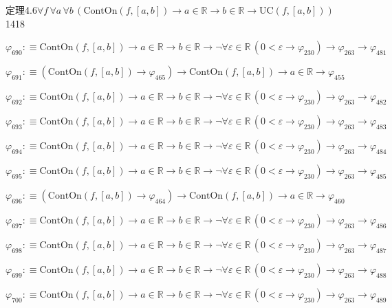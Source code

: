 \begin{fullproof}{定理4.6}{$\forall f\,\forall a\,\forall b\,(\mathrm{ContOn}(f,[a,b]) \to a \in \mathbb{R} \to b \in \mathbb{R} \to \mathrm{UC}(f,[a,b]))$}{1418}
\begin{abbrevlist}
\item $\varphi_{690} :\equiv \mathrm{ContOn}(f,[a,b]) \to a \in \mathbb{R} \to b \in \mathbb{R} \to \neg \forall \varepsilon \in \mathbb{R}\,(0 < \varepsilon \to \varphi_{230}) \to \varphi_{263} \to \varphi_{481}$
\item $\varphi_{691} :\equiv (\mathrm{ContOn}(f,[a,b]) \to \varphi_{465}) \to \mathrm{ContOn}(f,[a,b]) \to a \in \mathbb{R} \to \varphi_{455}$
\item $\varphi_{692} :\equiv \mathrm{ContOn}(f,[a,b]) \to a \in \mathbb{R} \to b \in \mathbb{R} \to \neg \forall \varepsilon \in \mathbb{R}\,(0 < \varepsilon \to \varphi_{230}) \to \varphi_{263} \to \varphi_{482}$
\item $\varphi_{693} :\equiv \mathrm{ContOn}(f,[a,b]) \to a \in \mathbb{R} \to b \in \mathbb{R} \to \neg \forall \varepsilon \in \mathbb{R}\,(0 < \varepsilon \to \varphi_{230}) \to \varphi_{263} \to \varphi_{483}$
\item $\varphi_{694} :\equiv \mathrm{ContOn}(f,[a,b]) \to a \in \mathbb{R} \to b \in \mathbb{R} \to \neg \forall \varepsilon \in \mathbb{R}\,(0 < \varepsilon \to \varphi_{230}) \to \varphi_{263} \to \varphi_{484}$
\item $\varphi_{695} :\equiv \mathrm{ContOn}(f,[a,b]) \to a \in \mathbb{R} \to b \in \mathbb{R} \to \neg \forall \varepsilon \in \mathbb{R}\,(0 < \varepsilon \to \varphi_{230}) \to \varphi_{263} \to \varphi_{485}$
\item $\varphi_{696} :\equiv (\mathrm{ContOn}(f,[a,b]) \to \varphi_{464}) \to \mathrm{ContOn}(f,[a,b]) \to a \in \mathbb{R} \to \varphi_{460}$
\item $\varphi_{697} :\equiv \mathrm{ContOn}(f,[a,b]) \to a \in \mathbb{R} \to b \in \mathbb{R} \to \neg \forall \varepsilon \in \mathbb{R}\,(0 < \varepsilon \to \varphi_{230}) \to \varphi_{263} \to \varphi_{486}$
\item $\varphi_{698} :\equiv \mathrm{ContOn}(f,[a,b]) \to a \in \mathbb{R} \to b \in \mathbb{R} \to \neg \forall \varepsilon \in \mathbb{R}\,(0 < \varepsilon \to \varphi_{230}) \to \varphi_{263} \to \varphi_{487}$
\item $\varphi_{699} :\equiv \mathrm{ContOn}(f,[a,b]) \to a \in \mathbb{R} \to b \in \mathbb{R} \to \neg \forall \varepsilon \in \mathbb{R}\,(0 < \varepsilon \to \varphi_{230}) \to \varphi_{263} \to \varphi_{488}$
\item $\varphi_{700} :\equiv \mathrm{ContOn}(f,[a,b]) \to a \in \mathbb{R} \to b \in \mathbb{R} \to \neg \forall \varepsilon \in \mathbb{R}\,(0 < \varepsilon \to \varphi_{230}) \to \varphi_{263} \to \varphi_{489}$

\end{abbrevlist}
\end{fullproof}
